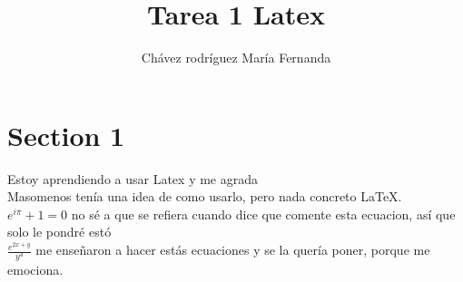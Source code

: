 


\title{Tarea 1 Latex}
\author{Chávez rodríguez María Fernanda}





\section {Section 1}

Estoy aprendiendo a usar Latex y me agrada \\ 

Masomenos tenía una idea de como usarlo, pero nada concreto \LaTeX.\\

$ e^{i \pi} + 1 = 0 $ no sé a que se refiera cuando dice que comente esta ecuacion, así que solo le pondré estó \\

$ \frac{e^{2x+y}}{y^4} $ me enseñaron a hacer estás ecuaciones y se la quería poner, porque me emociona. 



